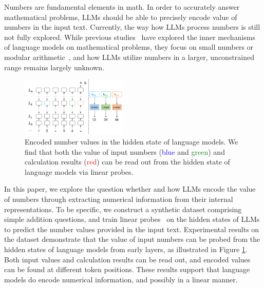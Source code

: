 \documentclass[11pt]{article}
\begin{document}
Numbers are fundamental elements in math.
In order to accurately answer mathematical problems, LLMs should be able to precisely encode value of numbers in the input text.
Currently, the way how LLMs process numbers is still not fully explored.
While previous studies~\cite{stolfo2023mechanistic, hanna2024does} have explored the inner mechanisms of language models on mathematical problems, they focus on small numbers or modular arithmetic~\cite{engels2024not, zhong2024clock}, and how LLMs utilize numbers in a larger, unconstrained range remains largely unknown.

\begin{figure}[t]
    \centering
    \includegraphics[width=0.45\textwidth]{figures/datapath.pdf}
    \caption{Encoded number values in the hidden state of language models. We find that both the value of input numbers (\textcolor{Blue}{blue} and \textcolor{Green}{green}) and calculation results (\textcolor{Red}{red}) can be read out from the hidden state of language models via linear probes.}
    \label{fig:datapath}
\end{figure}

In this paper, we explore the question whether and how LLMs encode the value of numbers through extracting numerical information from their internal representations.
To be specific, we construct a synthetic dataset comprising simple addition questions, and train linear probes~\cite{nanda2023emergent, gurnee2023language} on the hidden states of LLMs to predict the number values provided in the input text.
Experimental results on the dataset demonstrate that the value of input numbers can be probed from the hidden states of language models from early layers, as illustrated in Figure \ref{fig:datapath}.
Both input values and calculation results can be read out, and encoded values can be found at different token positions.
These results support that language models do encode numerical information, and possibly in a linear manner.
\end{document}
